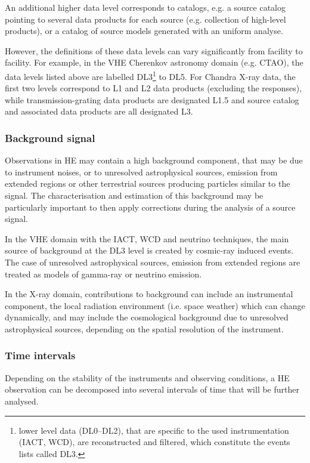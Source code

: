 \documentclass[11pt,a4paper]{ivoa}
\begin{document}
An additional higher data level corresponds to catalogs, e.g. a source catalog pointing to several data products for each source (e.g. collection of high-level products), or a catalog of source models generated with an uniform analyse.

However, the definitions of these data levels can vary significantly from facility to facility. For example, in the \gls{VHE} Cherenkov astronomy domain (e.g. \gls{CTAO}), the data levels listed above are labelled DL3\footnote{lower
level data (DL0--DL2), that are specific to the used instrumentation (\gls{IACT}, \gls{WCD}), are reconstructed and filtered, which
constitute the events lists called DL3.} to DL5. For Chandra X-ray data, the first two levels correspond  to L1 and L2 data products (excluding the responses), while transmission-grating data products are designated L1.5 and source catalog and associated data products are all designated L3.


\subsubsection{Background signal}

Observations in \gls{HE} may contain a high background component, that may be due to instrument noises, or to unresolved astrophysical sources, emission from extended regions or other terrestrial sources producing particles similar to the signal. The characterisation and estimation of this background may be particularly important to then apply corrections during the analysis of a source signal.

In the \gls{VHE} domain with the \gls{IACT}, \gls{WCD} and neutrino techniques, the main source of background at the DL3 level is created by cosmic-ray induced events. The case of unresolved astrophysical sources, emission from extended regions are treated as models of gamma-ray or neutrino emission.

In the X-ray domain, contributions to background can include an instrumental component, the local radiation environment (i.e. space weather) which can change dynamically, and may include the cosmological background due to unresolved astrophysical sources, depending on the spatial resolution of the instrument.


\subsubsection{Time intervals}

Depending on the stability of the instruments and observing conditions, a \gls{HE} observation can be decomposed into several intervals of time that will be further analysed.
\end{document}
